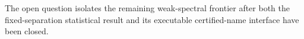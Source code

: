The open question isolates the remaining weak-spectral frontier after both the fixed-separation statistical result and its executable certified-name interface have been closed.